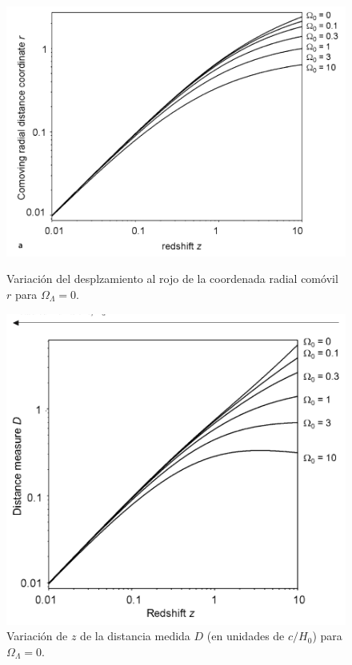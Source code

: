 \documentclass[11pt]{article}
\begin{document}
{\begin{figure}[H]
        \begin{minipage}[b]{0.5\linewidth}
        \centering
        \includegraphics[scale=0.42]{redshift_r7a.png}
        \caption{\footnotesize{Variación del desplzamiento al rojo de la coordenada radial comóvil $r$ para $\Omega_{\Lambda}=0$.}}
    \end{minipage}
        \hspace{0.5cm}
    \begin{minipage}[b]{0.4\linewidth}
        \centering
        \includegraphics[scale=0.4]{redshift_r77.png}
        \caption{\footnotesize{Variación de $z$ de la distancia medida $D$ (en unidades de $c/H_0$) para $\Omega_{\Lambda}=0$. }}
    \end{minipage}
\end{figure}


}
\end{document}
